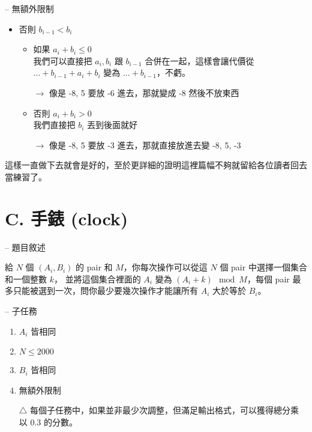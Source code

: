 \documentclass[hyperref,UTF8,notheorems,xcolor={dvipsnames}]{beamer}
\newcommand{\btitle}[1]{{\secname} -- #1}
\theoremstyle{definition}
\begin{document}
\begin{frame}[fragile]{\btitle{無額外限制}}
	\begin{itemize}
		\item 否則 $b_{i - 1} < b_i$ 
			\pause
			\begin{itemize}
				\item 如果 $a_{i} + b_{i} \le 0$ \\
				我們可以直接把 $a_i, b_i$ 跟 $b_{i - 1}$ 合併在一起，這樣會讓代價從 $... + b_{i - 1} + a_{i} + b_{i}$ 變為 $... + b_{i - 1}$，不虧。
				\pause
				\item[$\rightarrow$] 像是 -8, 5 要放 -6 進去，那就變成 -8 然後不放東西
				\pause
				\item 否則 $a_{i} + b_{i} > 0$ \\
				我們直接把 $b_i$ 丟到後面就好
				\pause

				\item[$\rightarrow$] 像是 -8, 5 要放 -3 進去，那就直接放進去變 -8, 5, -3

			\end{itemize}

	\end{itemize}
	\pause

	這樣一直做下去就會是好的，至於更詳細的證明這裡篇幅不夠就留給各位讀者回去當練習了。
	
\end{frame}

\section{C.  手錶 (clock)}

\begin{frame}[fragile]{\btitle{題目敘述}}

	給 $N$ 個 $(A_i, B_i)$ 的 pair 和 $M$，你每次操作可以從這 $N$ 個 pair 中選擇一個集合和一個整數 $k$，
	並將這個集合裡面的 $A_i$ 變為 $(A_i + k) \mod M$，每個 pair 最多只能被選到一次，問你最少要幾次操作才能讓所有 $A_i$ 大於等於 $B_i$。

\end{frame}

\begin{frame}[fragile]{\btitle{子任務}}
	\begin{enumerate}
		\item $A_i$ 皆相同
		\item $N \le 2000$
		\item $B_i$ 皆相同
		\item 無額外限制
		\item[$\triangle$] 每個子任務中，如果並非最少次調整，但滿足輸出格式，可以獲得總分乘以 0.3 的分數。
	\end{enumerate}
\end{frame}
\end{document}
